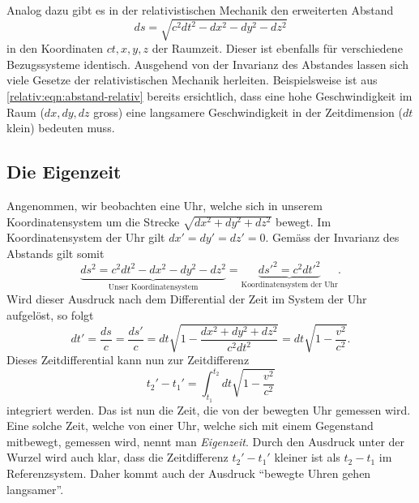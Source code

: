 Analog dazu gibt es in der relativistischen Mechanik den erweiterten Abstand
\begin{equation}
    ds = \sqrt{c^2dt^2 - dx^2 - dy^2 - dz^2}
    \label{relativ:eqn:abstand-relativ}
\end{equation}
in den Koordinaten \(ct, x, y, z\) der Raumzeit.
Dieser ist ebenfalls für verschiedene Bezugssysteme identisch.
Ausgehend von der Invarianz des Abstandes lassen sich
viele Gesetze der relativistischen Mechanik herleiten.
Beispielsweise ist aus \eqref{relativ:eqn:abstand-relativ}
bereits ersichtlich, dass eine hohe Geschwindigkeit
im Raum (\(dx, dy, dz\) gross) eine langsamere Geschwindigkeit
in der Zeitdimension (\(dt\) klein) bedeuten muss.


\subsection{Die Eigenzeit 
\label{relativ:section:eigenzeit}}

Angenommen, wir beobachten eine Uhr,
welche sich in unserem Koordinatensystem um die Strecke
\(\sqrt{dx^2 + dy^2 + dz^2}\)
bewegt.
Im Koordinatensystem der Uhr gilt
\(dx' = dy' = dz' = 0\).
Gemäss der Invarianz des Abstands gilt somit
\begin{equation*}
    \underbrace{ds^2 = c^2 dt^2 - dx^2 - dy^2 - dz^2}_{\text{Unser Koordinatensystem}}
        = \underbrace{ds'^2 = c^2 dt'^2}_{\text{Koordinatensystem der Uhr}} .
\end{equation*}
Wird dieser Ausdruck nach dem Differential der Zeit im System der Uhr aufgelöst,
so folgt
\begin{equation}
    dt' = \frac{ds}{c} = \frac{ds'}{c}
    = dt \sqrt{1 - \frac{dx^2+dy^2+dz^2}{c^2 dt^2}}
    = dt \sqrt{1 - \frac{v^2}{c^2}}.
    \label{relativ:eqn:differential-eigenzeit}
\end{equation}
Dieses Zeitdifferential kann nun zur Zeitdifferenz
\begin{equation}
    t_2' - t_1' = \int_{t_1}^{t_2} dt \sqrt{1 - \frac{v^2}{c^2}}
    \label{relativ:eqn:eigenzeit}
\end{equation}
integriert werden.
Das ist nun die Zeit, die von der bewegten Uhr gemessen wird.
Eine solche Zeit, welche von einer Uhr,
welche sich mit einem Gegenstand mitbewegt, gemessen wird,
nennt man \emph{Eigenzeit}.
Durch den Ausdruck unter der Wurzel wird auch klar,
dass die Zeitdifferenz \(t_2'- t_1'\) kleiner ist
als \(t_2 - t_1\) im Referenzsystem.
Daher kommt auch der Ausdruck
``bewegte Uhren gehen langsamer''.



